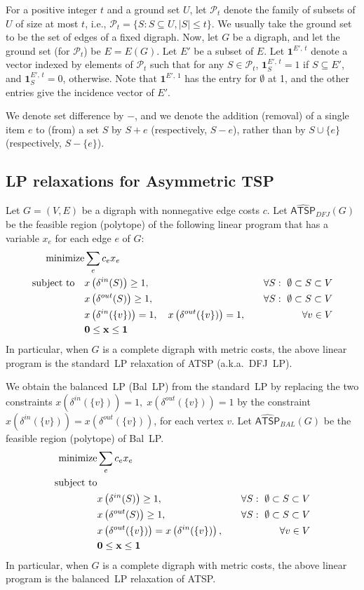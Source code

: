 \documentclass[11pt]{article}
\newcommand{\pop}{\mathcal{P}}
\newcommand{\xout}[1]{x\left( \delta^{out}(#1)\right)}
\newcommand{\xin}[1]{x\left( \delta^{in}(#1)\right)}
\newcommand{\atspbalpolytope}{\widehat{\textsf{ATSP}}_{\mathit{BAL}}}
\newcommand{\atspdfjpolytope}{\widehat{\textsf{ATSP}}_{\mathit{DFJ}}}
\newcommand{\tsp}{\textsc{TSP}}
\newcommand\bx {{\bf x}}
\newcommand{\onevec}[2]{\textbf{1}^{#1,\,#2}}		\newcommand{\goodfrac}[2]{F^{#1}(#2)}	\newcommand{\szgoodfrac}[2]{f^{#1}(#2)}	\newcommand{\cindex}[1]{\textit{index}(#1)} \newcommand{\indfrac}{h}	\newcommand{\tour}{\textit{tour\/}}
\begin{document}
For a positive integer $t$ and a ground set $U$, let $\pop_{t}$ denote the
family of subsets of $U$ of size at most $t$, i.e.,
$\pop_{t} = \{ S :  S \subseteq U, |S| \leq t\}$.
We usually take the ground set to be the set of edges of a fixed digraph.
Now, let $G$ be a digraph, and
let the ground set (for $\pop_{t}$) be $E=E(G)$.
Let $E'$ be a subset of $E$.
Let $\onevec{E'}{t}$ denote a vector indexed by elements of $\pop_{t}$
such that for any $S \in \pop_t$, $\onevec{E'}{t}_S=1$ if $S\subseteq{E'}$,
and $\onevec{E'}{t}_S = 0$, otherwise.
Note that $\onevec{E'}{1}$ has the entry for $\emptyset$ at 1,
and the other entries give the incidence vector of $E'$.


We denote set difference by $-$, and
we denote the addition (removal) of a single item $e$
to (from) a set $S$ by $S+e$ (respectively, $S-e$),
rather than by $S\cup\{e\}$ (respectively, $S-\{e\}$).


\subsection{LP relaxations for Asymmetric \tsp}\label{sec:atsp-relaxations}
\label{subsec:atsp-lp}

Let $G=(V,E)$ be a digraph with nonnegative edge costs $c$. Let
$\atspdfjpolytope(G)$ be the feasible region (polytope) of the following
linear program that has a variable $x_e$ for each edge $e$ of $G$:
\begin{align}
\textup{minimize} & \sum_{e} c_e x_e & \notag \\
\textup{subject to} \quad
  & \xin{S} \geq 1,& \quad \forall S:~\emptyset \subset S \subset V \notag  \\
  & \xout{S} \geq 1,& \quad \forall S:~\emptyset \subset S \subset V \notag  \\
  & \xin{\{v\}}  = 1, \quad \xout{\{v\}} = 1, & \quad \forall v \in V \notag  \\
& \textbf{0} \leq \bx \leq \textbf{1} & \notag
\end{align}
In particular, when $G$ is a complete digraph with metric costs, the
above linear program is the standard~LP relaxation of ATSP
(a.k.a.~DFJ~LP).

We obtain the balanced~LP (Bal~LP) from the standard~LP by
replacing the two constraints
$\xin{\{v\}}  = 1,\; \xout{\{v\}} = 1$
by the constraint
$\xin{\{v\}}  = \xout{\{v\}}$,
for each vertex $v$.
Let $\atspbalpolytope(G)$ be the feasible region (polytope) of Bal~LP.
\begin{align}
\textup{minimize} & \sum_{e} c_e x_e & \notag \\
\textup{subject to} && \notag \\
  & \xin{S} \geq 1,& \quad \forall S:~\emptyset \subset S \subset V \notag  \\
  & \xout{S} \geq 1,& \quad \forall S:~\emptyset \subset S \subset V \notag  \\
  & \xout{\{v\}} =  \xin{\{v\}},& \quad \forall v \in V \notag  \\
  & \textbf{0} \leq \bx \leq \textbf{1} & \notag
\end{align}
In particular, when $G$ is a complete digraph with metric costs, the
above linear program is the balanced~LP relaxation of ATSP.
\end{document}
